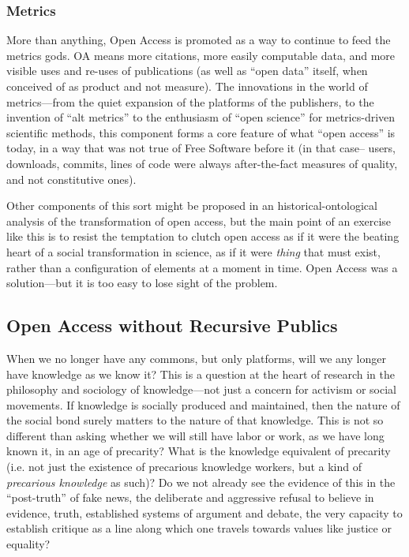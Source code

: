 \documentclass[11pt]{article}
\begin{document}
\subsubsection*{\textbf{Metrics}}
\label{sec:org0393360}
More than anything, Open Access is promoted as a way to continue to feed the metrics gods.  OA means more citations, more easily computable data, and more visible uses and re-uses of publications (as well as ``open data'' itself, when conceived of as product and not measure).  The innovations in the world of metrics---from the quiet expansion of the platforms of the publishers, to the invention of ``alt metrics'' to the enthusiasm of ``open science'' for metrics-driven scientific methods, this component forms a core feature of what ``open access'' is today, in a way that was not true of Free Software before it (in that case-- users, downloads, commits, lines of code were always after-the-fact measures of quality, and not constitutive ones).  

Other components of this sort might be proposed in an historical-ontological analysis of the transformation of open access, but the main point of an exercise like this is to resist the temptation to clutch open access as if it were the beating heart of a social transformation in science, as if it were  \emph{thing} that must exist, rather than a configuration of elements at a moment in time.  Open Access was a solution---but it is too easy to lose sight of the problem. 

\subsection*{Open Access without Recursive Publics}
\label{sec:org1e37e1d}

When we no longer have any commons, but only platforms, will we any longer have knowledge as we know it?  This is a question at the heart of research in the philosophy and sociology of knowledge---not just a concern for activism or social movements.  If knowledge is socially produced and maintained, then the nature of the social bond surely matters to the nature of that knowledge.   This is not so different than asking whether we  will still have labor or work, as we have long known it, in an age of precarity?  What is the knowledge equivalent of precarity (i.e. not just the existence of precarious knowledge workers, but a kind of \emph{precarious knowledge} as such)?  Do we not already see the evidence of this in the ``post-truth'' of fake news, the deliberate and aggressive refusal to believe in evidence, truth, established systems of argument and debate, the very capacity to establish critique as a line along which one travels towards values like justice or equality?
\end{document}
